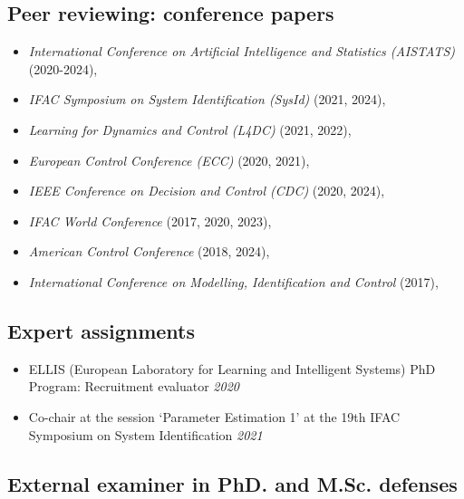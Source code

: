 \documentclass[10pt,A4]{article} %
\begin{document}
\subsection{Peer reviewing: conference papers}

\begin{itemize}
  
  \item {\em International Conference on Artificial Intelligence and Statistics (AISTATS) } (2020-2024),
    
  \item {\em IFAC Symposium on System Identification (SysId) } (2021, 2024),
    
  \item {\em Learning for Dynamics and Control (L4DC) } (2021, 2022),
    
  \item {\em European Control Conference (ECC) } (2020, 2021),
    
  \item {\em IEEE Conference on Decision and Control (CDC) } (2020, 2024),
    
  \item {\em IFAC World Conference } (2017, 2020, 2023),
    
  \item {\em American Control Conference } (2018, 2024),
    
  \item {\em International Conference on Modelling, Identification and Control } (2017),
    
\end{itemize}
  
\subsection{Expert assignments}

\begin{itemize}  
  
  \item ELLIS (European Laboratory for Learning and Intelligent Systems) PhD Program: Recruitment evaluator \hfill {\em 2020 }
  
  \item Co-chair at the session `Parameter Estimation 1' at the 19th IFAC Symposium on System Identification \hfill {\em 2021 }
  
\end{itemize}

\subsection{External examiner in PhD. and M.Sc. defenses}
\end{document}
